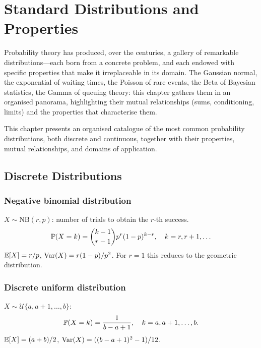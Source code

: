 \chapter{Standard Distributions and Properties}
\label{ch:distributions}

Probability theory has produced, over the centuries, a gallery of remarkable distributions---each born from a concrete problem, and each endowed with specific properties that make it irreplaceable in its domain. The Gaussian normal, the exponential of waiting times, the Poisson of rare events, the Beta of Bayesian statistics, the Gamma of queuing theory: this chapter gathers them in an organised panorama, highlighting their mutual relationships (sums, conditioning, limits) and the properties that characterise them.

\begin{intuition}
This chapter presents an organised catalogue of the most common probability
distributions, both discrete and continuous, together with their properties,
mutual relationships, and domains of application.
\end{intuition}

\section{Discrete Distributions}

\subsection{Negative binomial distribution}

\begin{definition}
$X \sim \mathrm{NB}(r, p)$: number of trials to obtain the $r$-th success.
\[
    \mathbb{P}(X = k) = \binom{k-1}{r-1} p^r(1-p)^{k-r}, \quad k = r, r+1, \ldots
\]
$\mathbb{E}[X] = r/p$, $\mathrm{Var}(X) = r(1-p)/p^2$. For $r=1$ this reduces to the geometric
distribution.
\end{definition}

\subsection{Discrete uniform distribution}

\begin{definition}
$X \sim \mathcal{U}\{a, a+1, \ldots, b\}$:
\[
    \mathbb{P}(X = k) = \frac{1}{b-a+1}, \quad k = a, a+1, \ldots, b.
\]
$\mathbb{E}[X] = (a+b)/2$, $\mathrm{Var}(X) = ((b-a+1)^2-1)/12$.
\end{definition}

